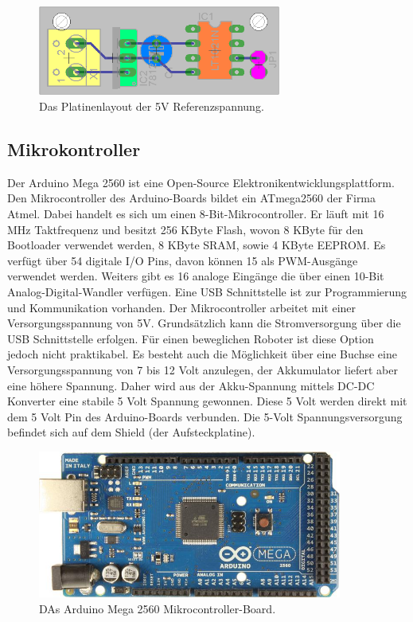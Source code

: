 \documentclass[a4paper,bibtotoc,oneside]{scrbook}
\begin{document}
\begin{figure}[htbp]
\centering
\includegraphics[width=80mm]{img/refu2.png}
\caption{Das Platinenlayout der 5V Referenzspannung.}\label{refu2}
\end{figure}

 
\subsection{Mikrokontroller}\thispagestyle{empty}
Der Arduino Mega 2560 ist eine Open-Source Elektronikentwicklungsplattform. Den Mikrocontroller des Arduino-Boards bildet ein ATmega2560 der Firma Atmel. Dabei handelt es sich um einen 8-Bit-Mikrocontroller.  Er läuft mit 16 MHz Taktfrequenz und besitzt 256 KByte Flash, wovon 8 KByte für den Bootloader verwendet werden, 8 KByte SRAM, sowie 4 KByte EEPROM.  Es verfügt über 54 digitale I/O Pins, davon können 15 als PWM-Ausgänge verwendet werden. Weiters gibt es 16 analoge Eingänge die über einen 10-Bit Analog-Digital-Wandler verfügen.
Eine USB Schnittstelle ist zur Programmierung und Kommunikation vorhanden.
Der Mikrocontroller arbeitet mit einer Versorgungsspannung von 5V.
Grundsätzlich kann die Stromversorgung über die USB Schnittstelle erfolgen. Für einen beweglichen Roboter ist diese Option jedoch nicht praktikabel. Es besteht auch die Möglichkeit über eine Buchse eine Versorgungsspannung von 7 bis 12 Volt anzulegen, der Akkumulator liefert aber eine höhere Spannung. 
Daher wird aus der Akku-Spannung mittels DC-DC Konverter eine stabile 5 Volt Spannung gewonnen. Diese 5 Volt werden direkt mit dem 5 Volt Pin des Arduino-Boards verbunden. Die 5-Volt Spannungsversorgung befindet sich auf dem Shield (der Aufsteckplatine).

\begin{figure}[htbp]
\centering
\includegraphics[width=100mm]{img/ArduinoMega2.jpg}
\caption[Arduino Mega 2560]{DAs Arduino Mega 2560 Mikrocontroller-Board.}\label{ardu}
\end{figure}
\end{document}
